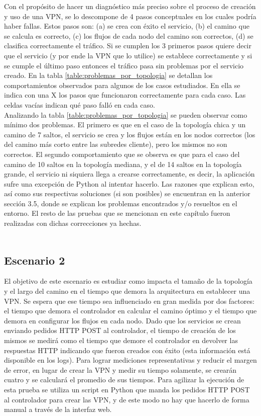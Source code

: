 Con el propósito de hacer un diagnóstico más preciso sobre el proceso de creación y uso de una VPN, se lo descompone de 4 pasos conceptuales en los cuales podría haber fallas. Estos pasos son: (a) se crea con éxito el servicio, (b) el camino que se calcula es correcto, (c) los flujos de cada nodo del camino son correctos, (d) se clasifica correctamente el tráfico. Si se cumplen los 3 primeros pasos quiere decir que el servicio (y por ende la VPN que lo utilice) se establece correctamente y si se cumple el último paso entonces el tráfico pasa sin problemas por el servicio creado. En la tabla \ref{table:problemas_por_topologia} se detallan los comportamientos observados para algunos de los casos estudiados. En ella se indica con una X los pasos que funcionaron correctamente para cada caso. Las celdas vacías indican qué paso falló en cada caso. \\

Analizando la tabla \ref{table:problemas_por_topologia} se pueden observar como mínimo dos problemas. El primero es que en el caso de la topología chica y un camino de 7 saltos, el servicio se crea y los flujos están en los nodos correctos (los del camino más corto entre las subredes cliente), pero los mismos no son correctos. El segundo comportamiento que se observa es que para el caso del camino de 10 saltos en la topología mediana, y el de 14 saltos en la topología grande, el servicio ni siquiera llega a crearse correctamente, es decir, la aplicación sufre una excepción de Python al intentar hacerlo. Las razones que explican esto, así como sus respectivas soluciones (si son posibles) se encuentran en la anterior sección 3.5, donde se explican los problemas encontrados y/o resueltos en el entorno. El resto de las pruebas que se mencionan en este capítulo fueron realizadas con dichas correcciones ya hechas.\\ \\

\subsection{Escenario 2}
El objetivo de este escenario es estudiar como impacta el tamaño de la topología y el largo del camino en el tiempo que demora la arquitectura en establecer una VPN. Se espera que ese tiempo sea influenciado en gran medida por dos factores: el tiempo que demora el controlador en calcular el camino óptimo y el tiempo que demora en configurar los flujos en cada nodo. Dado que los servicios se crean enviando pedidos HTTP POST al controlador, el tiempo de creación de los mismos se medirá como el tiempo que demore el controlador en devolver las respuestas HTTP indicando que fueron creados con éxito (esta información está disponible en los logs). Para lograr mediciones representativas y reducir el margen de error, en lugar de crear la VPN y medir su tiempo solamente, se crearán cuatro y se calculará el promedio de sus tiempos. Para agilizar la ejecución de esta prueba se utiliza un script en Python que manda los pedidos HTTP POST al controlador para crear las VPN, y de este modo no hay que hacerlo de forma manual a través de la interfaz web.

